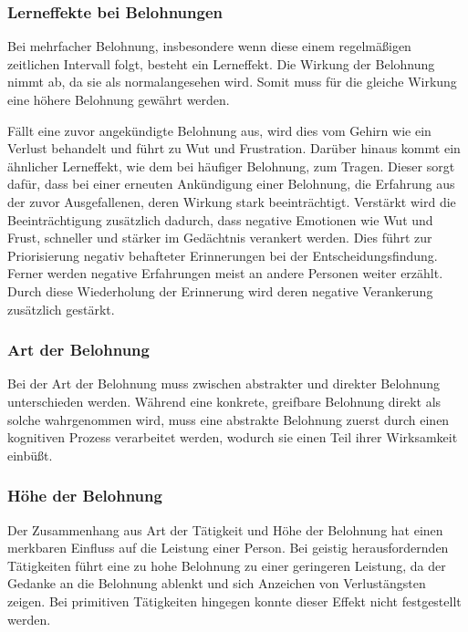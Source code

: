 \subsubsection{Lerneffekte bei Belohnungen}
Bei mehrfacher Belohnung, insbesondere wenn diese einem regelmäßigen zeitlichen Intervall folgt, besteht ein Lerneffekt. Die Wirkung der Belohnung nimmt ab, da sie als \glqq normal\grqq angesehen wird. Somit muss für die gleiche Wirkung eine höhere Belohnung gewährt werden. \citep[S. 80]{Nowka.2013}
 
Fällt eine zuvor angekündigte Belohnung aus, wird dies vom Gehirn wie ein Verlust behandelt und führt zu Wut und Frustration. Darüber hinaus kommt ein ähnlicher Lerneffekt, wie dem bei häufiger Belohnung, zum Tragen. Dieser sorgt dafür, dass bei einer erneuten Ankündigung einer Belohnung, die Erfahrung aus der zuvor Ausgefallenen, deren Wirkung stark beeinträchtigt. Verstärkt wird die Beeinträchtigung zusätzlich dadurch, dass negative Emotionen wie Wut und Frust, schneller und stärker im Gedächtnis verankert werden. Dies führt zur Priorisierung negativ behafteter Erinnerungen bei der Entscheidungsfindung. Ferner werden negative Erfahrungen meist an andere Personen weiter erzählt. Durch diese Wiederholung der Erinnerung wird deren negative Verankerung zusätzlich gestärkt. \citep[S. 76ff]{Nowka.2013}

\subsubsection{Art der Belohnung}
Bei der Art der Belohnung muss zwischen abstrakter und direkter Belohnung unterschieden werden. Während eine konkrete, greifbare Belohnung direkt als solche wahrgenommen wird, muss eine abstrakte Belohnung zuerst durch einen kognitiven Prozess verarbeitet werden, wodurch sie einen Teil ihrer Wirksamkeit einbüßt. \citep[S. 79f]{Nowka.2013}

\subsubsection{Höhe der Belohnung}
\label{sec:HöheDerBelohnung}
Der Zusammenhang aus Art der Tätigkeit und Höhe der Belohnung hat einen merkbaren Einfluss auf die Leistung einer Person. Bei geistig herausfordernden Tätigkeiten führt eine zu hohe Belohnung zu einer geringeren Leistung, da der Gedanke an die Belohnung ablenkt und sich Anzeichen von Verlustängsten zeigen. Bei primitiven Tätigkeiten hingegen konnte dieser Effekt nicht festgestellt werden. \citep[S. 80f]{Nowka.2013}

